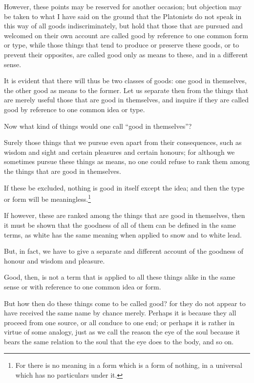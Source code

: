 However, these points may be reserved for another occasion; but
objection may be taken to what I have said on the ground that the
Platonists do not speak in this way of all goods indiscriminately, but
hold that those that are pursued and welcomed on their own account are
called good by reference to one common form or type, while those
things that tend to produce or preserve these goods, or to prevent
their opposites, are called good only as means to these, and in a
different sense.

It is evident that there will thus be two classes of goods: one good
in themselves, the other good as means to the former. Let us separate
then from the things that are merely useful those that are good in
themselves, and inquire if they are called good by reference to one
common idea or type.

Now what kind of things would one call ``good in themselves''?

Surely those things that we pursue even apart from their consequences,
such as wisdom and sight  and certain pleasures and certain
honours; for although we sometimes pursue these things as means, no
one could refuse to rank them among the things that are good in
themselves.

If these be excluded, nothing is good in itself except the idea; and
then the type or form will be meaningless.\footnote{For there is no
meaning in a form which is a form of nothing, in a universal which has
no particulars under it.}

If however, these are ranked among the things that are good in
themselves, then it must be shown that the goodness of all of them can
be defined in the same terms, as white has the same meaning when
applied to snow and to white lead.

But, in fact, we have to give a separate and different account of the
goodness of honour and wisdom and pleasure.

Good, then, is not a term that is applied to all these things alike in
the same sense or with reference to one common idea or form.

But how then do these things come to be called good? for they do not
appear to have received the same name by chance merely. Perhaps it is
because they all proceed from one source, or all conduce to one end;
or perhaps it is rather in virtue of some analogy, just as we call the
reason the eye of the soul because it bears the same relation to the
soul that the eye does to the body, and so on.

